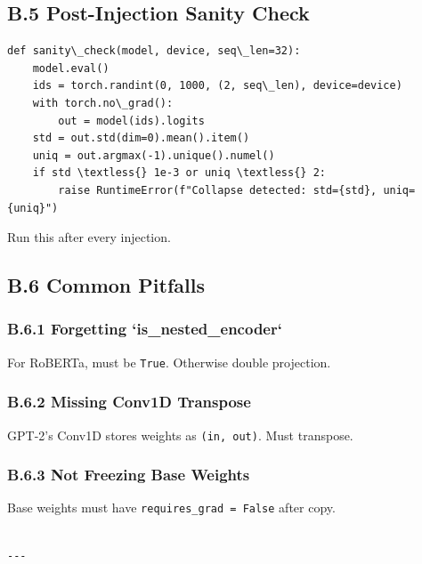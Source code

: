\subsection{B.5 Post-Injection Sanity Check}

\begin{lstlisting}
def sanity\_check(model, device, seq\_len=32):
    model.eval()
    ids = torch.randint(0, 1000, (2, seq\_len), device=device)
    with torch.no\_grad():
        out = model(ids).logits
    std = out.std(dim=0).mean().item()
    uniq = out.argmax(-1).unique().numel()
    if std \textless{} 1e-3 or uniq \textless{} 2:
        raise RuntimeError(f"Collapse detected: std={std}, uniq={uniq}")
\end{lstlisting}

Run this after every injection.

\subsection{B.6 Common Pitfalls}

\subsubsection{B.6.1 Forgetting `is\_nested\_encoder`}

For RoBERTa, must be \texttt{True}. Otherwise double projection.

\subsubsection{B.6.2 Missing Conv1D Transpose}

GPT-2's Conv1D stores weights as \texttt{(in, out)}. Must transpose.

\subsubsection{B.6.3 Not Freezing Base Weights}

Base weights must have \texttt{requires\_grad = False} after copy.
\begin{lstlisting}

---
\end{lstlisting}